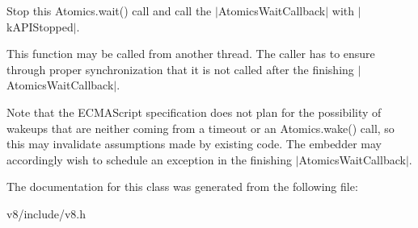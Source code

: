Stop this {\ttfamily Atomics.\+wait()} call and call the $\vert$\+Atomics\+Wait\+Callback$\vert$ with $\vert$k\+A\+P\+I\+Stopped$\vert$.

This function may be called from another thread. The caller has to ensure through proper synchronization that it is not called after the finishing $\vert$\+Atomics\+Wait\+Callback$\vert$.

Note that the E\+C\+M\+A\+Script specification does not plan for the possibility of wakeups that are neither coming from a timeout or an {\ttfamily Atomics.\+wake()} call, so this may invalidate assumptions made by existing code. The embedder may accordingly wish to schedule an exception in the finishing $\vert$\+Atomics\+Wait\+Callback$\vert$. 

The documentation for this class was generated from the following file\+:\begin{DoxyCompactItemize}
\item 
v8/include/v8.\+h\end{DoxyCompactItemize}
